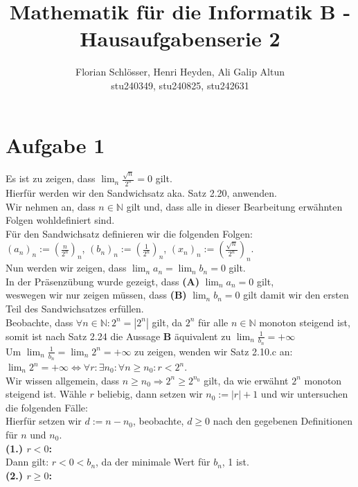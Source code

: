 \documentclass[12pt, a4paper]{article}
\title{Mathematik für die Informatik B - Hausaufgabenserie 2}
\author{Florian Schlösser, Henri Heyden, Ali Galip Altun \\ \small stu240349, stu240825, stu242631}
\date{}
\begin{document}
\maketitle


\doublespacing
\section*{Aufgabe 1}
Es ist zu zeigen, dass $\lim_{n}\frac{\sqrt{n}}{2^n} = 0$ gilt. \\
Hierfür werden wir den Sandwichsatz aka. Satz 2.20, anwenden. \\
Wir nehmen an, dass $n \in \mathbb{N}$ gilt und, dass alle in dieser Bearbeitung erwähnten Folgen wohldefiniert sind. \\
Für den Sandwichsatz definieren wir die folgenden Folgen: \\ $(a_n)_n := \left(\frac{n}{2^n}\right)_n$, $(b_n)_n := \left(\frac{1}{2^n}\right)_n$, $(x_n)_n := \left(\frac{\sqrt{n}}{2^n}\right)_n$.\\
Nun werden wir zeigen, dass $\lim_{n}a_n = \lim_{n}b_n = 0$ gilt. \\
In der Präsenzübung wurde gezeigt, dass \textbf{(A)} $\lim_{n}a_n = 0$ gilt, \\
weswegen wir nur zeigen müssen, dass \textbf{(B)} $\lim_{n}b_n = 0$ gilt damit wir den ersten Teil des Sandwichsatzes erfüllen. \\
Beobachte, dass $\forall n \in \mathbb N: 2^n = |2^n|$ gilt, da $2^n$ für alle $n \in \mathbb N$ monoton steigend ist, somit ist nach Satz 2.24 die Aussage \textbf{B} äquivalent zu $\lim_{n}\frac{1}{b_n} = +\infty$ \\
Um $\lim_{n}\frac{1}{b_n} = \lim_{n}2^n = +\infty$ zu zeigen, wenden wir Satz 2.10.c an: \\
$\lim_{n}2^n = +\infty \Longleftrightarrow \forall r: \exists n_0: \forall n \ge n_0: r < 2^n$. \\
Wir wissen allgemein, dass $n \ge n_0 \Rightarrow 2^n \ge 2^{n_0}$ gilt, da wie erwähnt $2^n$ monoton steigend ist.
Wähle $r$ beliebig, dann setzen wir $n_0 := |r| + 1$ und wir untersuchen die folgenden Fälle:\\
Hierfür setzen wir $d:= n - n_0$, beobachte, $d \ge 0$ nach den gegebenen Definitionen für $n$ und $n_0$. \\
\textbf{(1.) $r < 0$:} \\
Dann gilt: $r < 0 < b_n$, da der minimale Wert für $b_n$, 1 ist. \\
\textbf{(2.) $r \ge 0$:} \\
\end{document}
